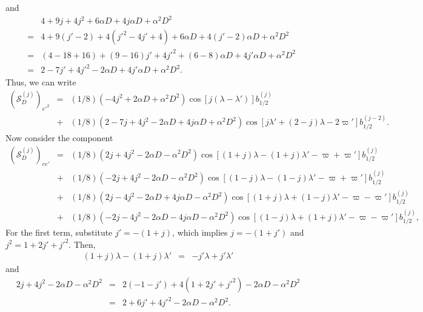 \documentclass [12pt, a4paper] {article}
\begin{document}
and 
\begin {eqnarray}
    &\:&
    4 + 9j + 4j^2 + 6\alpha D + 4j\alpha D + \alpha^2 D^2
    \\\nonumber
    &=& 
    4 + 9(j' - 2) + 4(j'^2 - 4j' + 4) + 6\alpha D + 4(j' - 2)\alpha D + \alpha^2 D^2
    \\
    &=&
    (4 - 18 + 16) + (9 - 16)j' + 4j'^2 + (6-8)\alpha D + 4j'\alpha D +  \alpha^2D^2
    \\
    &=&
    2 - 7j' + 4j'^2 - 2\alpha D + 4j'\alpha D+ \alpha^2D^2.
\end {eqnarray}
Thus, we can write 
\begin {eqnarray}
    \left(\mathcal{S}_D^{(j)}\right)_{e'^2} &=& 
    (1/8)
    \left(
        -4j^2 + 2\alpha D + \alpha^2D^2
    \right)
    \cos[j(\lambda - \lambda')]
    b_{1/2}^{(j)}
    \\\nonumber
    &+&
    (1/8)
    \left(
        2 - 7j + 4j^2 - 2\alpha D + 4j\alpha D + \alpha^2 D^2
    \right)
    \cos[j\lambda' + (2 - j)\lambda - 2\varpi']
    b_{1/2}^{(j-2)}.
\end {eqnarray}
Now consider the component 
\begin {eqnarray}
    \left(\mathcal{S}_D^{(j)}\right)_{ee'} &=& 
    (1/8)
    \left(
        2j + 4j^2 - 2\alpha D - \alpha^2D^2
    \right)
    \cos[(1+j)\lambda - (1+j)\lambda' - \varpi + \varpi']
    b_{1/2}^{(j)}
    \quad\quad
    \\\nonumber
    &+&
    (1/8)
    \left(
        -2j + 4j^2 - 2\alpha D - \alpha^2D^2
    \right)
    \cos[(1-j)\lambda - (1-j)\lambda' - \varpi + \varpi']
    b_{1/2}^{(j)}
    \\\nonumber
    &+&
    (1/8)
    \left(
        2j - 4j^2 - 2\alpha D + 4j\alpha D - \alpha^2D^2
    \right)
    \cos[(1+j)\lambda + (1-j)\lambda' - \varpi - \varpi']
    b_{1/2}^{(j)}
    \\\nonumber
    &+&
    (1/8)
    \left(
        -2j -4j^2 - 2\alpha D - 4j\alpha D - \alpha^2D^2
    \right)
    \cos[(1-j)\lambda + (1+j)\lambda' - \varpi - \varpi']
    b_{1/2}^{(j)},
\end {eqnarray}
For the first term, substitute $j'= -(1+j)$, which implies 
$j = - (1+j')$ and $j^2 = 1 + 2j' + j'^2$. Then,
\begin {eqnarray}
    (1 + j)\lambda - (1+ j)\lambda' 
    &=& 
    - j'\lambda + j'\lambda'
\end {eqnarray}
and 
\begin {eqnarray}
    2j + 4j^2 - 2\alpha D - \alpha^2D^2 
    &=&
    2(-1 - j') + 4(1 + 2j' + j'^2) - 2\alpha D - \alpha^2D^2
    \\
    &=& 
    2 + 6j' + 4j'^2 - 2\alpha D - \alpha^2D^2.
\end {eqnarray}
\end{document}
